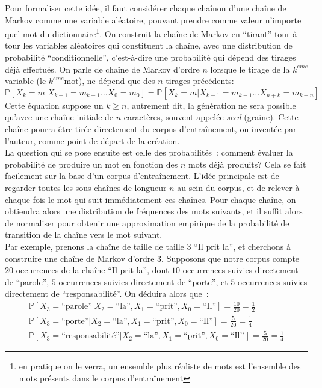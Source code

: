 \documentclass{article}
\begin{document}
				Pour formaliser cette idée, il faut considérer chaque chaînon d'une chaîne de Markov comme une variable aléatoire, pouvant prendre comme valeur n'importe quel mot du dictionnaire\footnote{en pratique on le verra, un ensemble plus réaliste de mots est l'ensemble des mots présents dans le corpus d'entraînement}. On construit la chaîne de Markov en ``tirant'' tour à tour les variables aléatoires qui constituent la chaîne, avec une distribution de probabilité ``conditionnelle'', c'est-à-dire une probabilité qui dépend des tirages déjà effectués. On parle de chaîne de Markov d'ordre $n$ lorsque le tirage de la $k^{eme}$ variable (le $k^{eme}$mot), ne dépend que des $n$ tirages précédents:
				\begin{equation}
					\mathbb{P}[X_{k} = m | X_{k-1} = m_{k-1} \dots X_{0} = m_0] = \mathbb{P}[X_k = m | X_{k-1} = m_{k-1} \dots X_{n+k} = m_{k-n}]
				\end{equation}
				Cette équation suppose un $k \geq n$, autrement dit, la génération ne sera possible qu'avec une chaîne initiale de $n$ caractères, souvent appelée \textit{seed} (graine). Cette chaîne pourra être tirée directement du corpus d'entraînement, ou inventée par l'auteur, comme point de départ de la création.\\
				
				La question qui se pose ensuite est celle des probabilités~: comment évaluer la probabilité de produire un mot en fonction des $n$ mots déjà produits? Cela se fait facilement sur la base d'un corpus d'entraînement. L'idée principale est de regarder toutes les sous-chaînes de longueur $n$ au sein du corpus, et de relever à chaque fois le mot qui suit immédiatement ces chaînes. Pour chaque chaîne, on obtiendra alors une distribution de fréquences des mots suivants, et il suffit alors de normaliser pour obtenir une approximation empirique de la probabilité de transition de la chaîne vers le mot suivant.\\
				
				Par exemple, prenons la chaîne de taille de taille $3$ ``Il prit la'', et cherchons à construire une chaîne de Markov d'ordre $3$. Supposons que notre corpus compte $20$ occurrences de la chaîne ``Il prit la'', dont $10$ occurrences suivies directement de ``parole'', $5$ occurrences suivies directement de ``porte'', et $5$ occurrences suivies directement de ``responsabilité''. On déduira alors que~:
				\begin{eqnarray}
					\mathbb{P}[X_3 = \mbox{``parole''} | X_2 = \mbox{``la''}, X_1 = \mbox{``prit''}, X_0 = \mbox{``Il''}] = \frac{10}{20} = \frac{1}{2}\\
					\mathbb{P}[X_3 = \mbox{``porte''} | X_2 = \mbox{``la''}, X_1 = \mbox{``prit''}, X_0 = \mbox{``Il''}] = \frac{5}{20} = \frac{1}{4}\\
					\mathbb{P}[X_3 = \mbox{``responsabilité''} | X_2 = \mbox{``la''}, X_1 = \mbox{``prit''}, X_0 = \mbox{``Il'}'] = \frac{5}{20} = \frac{1}{4}
				\end{eqnarray}
				
\end{document}
